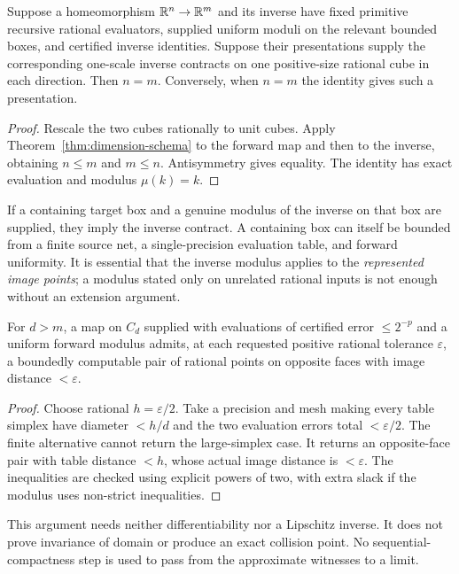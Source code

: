 \begin{corollary}\label{cor:equipped-dimension}
Suppose a homeomorphism $\mathbb R^n\to\mathbb R^m$ and its inverse have fixed primitive recursive rational evaluators, supplied uniform moduli on the relevant bounded boxes, and certified inverse identities. Suppose their presentations supply the corresponding one-scale inverse contracts on one positive-size rational cube in each direction. Then $n=m$. Conversely, when $n=m$ the identity gives such a presentation.
\end{corollary}
\begin{proof}
Rescale the two cubes rationally to unit cubes. Apply Theorem~\ref{thm:dimension-schema} to the forward map and then to the inverse, obtaining $n\leq m$ and $m\leq n$. Antisymmetry gives equality. The identity has exact evaluation and modulus $\mu(k)=k$.
\end{proof}

If a containing target box and a genuine modulus of the inverse on that box are supplied, they imply the inverse contract. A containing box can itself be bounded from a finite source net, a single-precision evaluation table, and forward uniformity. It is essential that the inverse modulus applies to the \emph{represented image points}; a modulus stated only on unrelated rational inputs is not enough without an extension argument.

\begin{corollary}\label{cor:face-collision}
For $d>m$, a map on $C_d$ supplied with evaluations of certified error $\leq2^{-p}$ and a uniform forward modulus admits, at each requested positive rational tolerance $\varepsilon$, a boundedly computable pair of rational points on opposite faces with image distance $<\varepsilon$.
\end{corollary}
\begin{proof}
Choose rational $h=\varepsilon/2$. Take a precision and mesh making every table simplex have diameter $<h/d$ and the two evaluation errors total $<\varepsilon/2$. The finite alternative cannot return the large-simplex case. It returns an opposite-face pair with table distance $<h$, whose actual image distance is $<\varepsilon$. The inequalities are checked using explicit powers of two, with extra slack if the modulus uses non-strict inequalities.
\end{proof}

This argument needs neither differentiability nor a Lipschitz inverse. It does not prove invariance of domain or produce an exact collision point. No sequential-compactness step is used to pass from the approximate witnesses to a limit.

